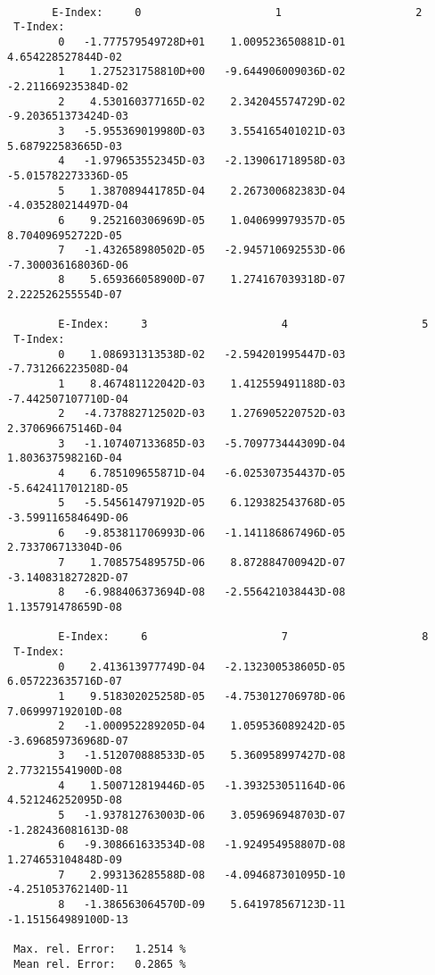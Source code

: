 \documentclass[12pt,dvipdfmx]{article}
\begin{document}
\begin{small}\begin{verbatim}

       E-Index:     0                     1                     2
 T-Index:
        0   -1.777579549728D+01    1.009523650881D-01    4.654228527844D-02
        1    1.275231758810D+00   -9.644906009036D-02   -2.211669235384D-02
        2    4.530160377165D-02    2.342045574729D-02   -9.203651373424D-03
        3   -5.955369019980D-03    3.554165401021D-03    5.687922583665D-03
        4   -1.979653552345D-03   -2.139061718958D-03   -5.015782273336D-05
        5    1.387089441785D-04    2.267300682383D-04   -4.035280214497D-04
        6    9.252160306969D-05    1.040699979357D-05    8.704096952722D-05
        7   -1.432658980502D-05   -2.945710692553D-06   -7.300036168036D-06
        8    5.659366058900D-07    1.274167039318D-07    2.222526255554D-07

        E-Index:     3                     4                     5
 T-Index:
        0    1.086931313538D-02   -2.594201995447D-03   -7.731266223508D-04
        1    8.467481122042D-03    1.412559491188D-03   -7.442507107710D-04
        2   -4.737882712502D-03    1.276905220752D-03    2.370696675146D-04
        3   -1.107407133685D-03   -5.709773444309D-04    1.803637598216D-04
        4    6.785109655871D-04   -6.025307354437D-05   -5.642411701218D-05
        5   -5.545614797192D-05    6.129382543768D-05   -3.599116584649D-06
        6   -9.853811706993D-06   -1.141186867496D-05    2.733706713304D-06
        7    1.708575489575D-06    8.872884700942D-07   -3.140831827282D-07
        8   -6.988406373694D-08   -2.556421038443D-08    1.135791478659D-08

        E-Index:     6                     7                     8
 T-Index:
        0    2.413613977749D-04   -2.132300538605D-05    6.057223635716D-07
        1    9.518302025258D-05   -4.753012706978D-06    7.069997192010D-08
        2   -1.000952289205D-04    1.059536089242D-05   -3.696859736968D-07
        3   -1.512070888533D-05    5.360958997427D-08    2.773215541900D-08
        4    1.500712819446D-05   -1.393253051164D-06    4.521246252095D-08
        5   -1.937812763003D-06    3.059696948703D-07   -1.282436081613D-08
        6   -9.308661633534D-08   -1.924954958807D-08    1.274653104848D-09
        7    2.993136285588D-08   -4.094687301095D-10   -4.251053762140D-11
        8   -1.386563064570D-09    5.641978567123D-11   -1.151564989100D-13

 Max. rel. Error:   1.2514 %
 Mean rel. Error:   0.2865 %
\end{verbatim}\end{small}
\end{document}
